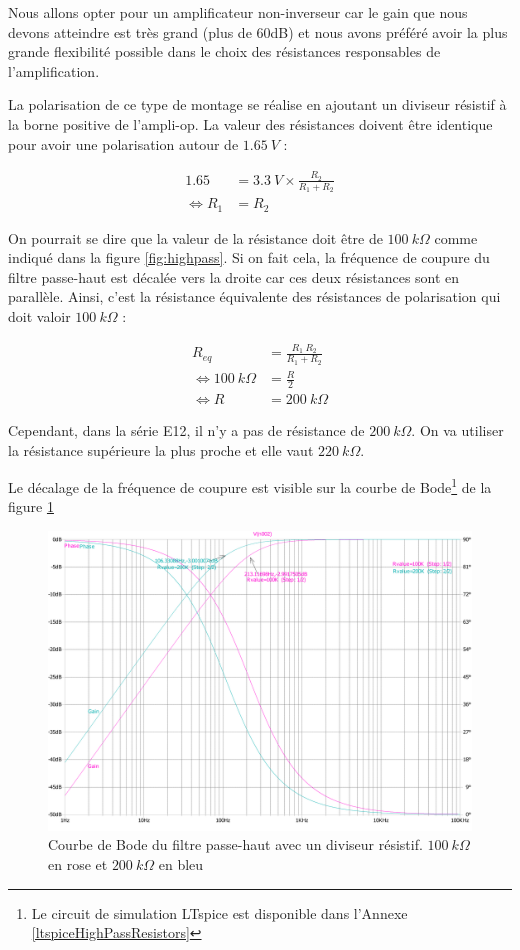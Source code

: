 Nous allons opter pour un amplificateur non-inverseur car le gain que nous devons atteindre est très grand (plus de $60$dB) et nous avons préféré avoir la plus grande flexibilité possible dans le choix des résistances responsables de l'amplification.

La polarisation de ce type de montage se réalise en ajoutant un diviseur résistif à la borne positive de l'ampli-op. La valeur des résistances doivent être identique pour avoir une polarisation autour de $1.65\ V$ :

\begin{align*}
    1.65 &= 3.3 \ V \times \frac{R_2}{R_1+R_2}\\
    \iff R_1&=R_2
\end{align*}

On pourrait se dire que la valeur de la résistance doit être de $100 \ k \Omega$ comme indiqué dans la figure \ref{fig:highpass}. Si on fait cela, la fréquence de coupure du filtre passe-haut est décalée vers la droite car ces deux résistances sont en parallèle. Ainsi, c'est la résistance équivalente des résistances de polarisation qui doit valoir $100 \ k \Omega$ :

\begin{align*}
    R_{eq}&= \frac{R_1 \ R_2}{R_1 + R_2 }\\
    \iff 100 \ k \Omega&= \frac{R}{2}\\
    \iff R&=200 \ k \Omega
\end{align*}

Cependant, dans la série E12, il n'y a pas de résistance de $200 \ k \Omega$. On va utiliser la résistance supérieure la plus proche et elle vaut $220 \ k \Omega$. 

Le décalage de la fréquence de coupure est visible sur la courbe de Bode\footnote{Le circuit de simulation LTspice est disponible dans l'Annexe \ref{ltspiceHighPassResistors} } de la figure \ref{fig:bodehighpasspol}

\begin{figure}[H]
    \centering
    \includegraphics[width=\textwidth]{pdffiles/HighPass/BodeHighPassPolarization.pdf}
    \caption{Courbe de Bode du filtre passe-haut avec un diviseur résistif. $100 \ k \Omega $ en rose et $200 \ k \Omega$ en bleu}
    \label{fig:bodehighpasspol}
\end{figure}


